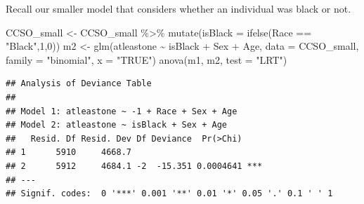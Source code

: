 \documentclass[
  ignorenonframetext,
]{beamer}
\newenvironment{Shaded}{\begin{snugshade}}{\end{snugshade}}
\newcommand{\AttributeTok}[1]{\textcolor[rgb]{0.77,0.63,0.00}{#1}}
\newcommand{\DecValTok}[1]{\textcolor[rgb]{0.00,0.00,0.81}{#1}}
\newcommand{\FunctionTok}[1]{\textcolor[rgb]{0.00,0.00,0.00}{#1}}
\newcommand{\NormalTok}[1]{#1}
\newcommand{\OtherTok}[1]{\textcolor[rgb]{0.56,0.35,0.01}{#1}}
\newcommand{\SpecialCharTok}[1]{\textcolor[rgb]{0.00,0.00,0.00}{#1}}
\newcommand{\StringTok}[1]{\textcolor[rgb]{0.31,0.60,0.02}{#1}}
\begin{document}
\begin{frame}[fragile]{}
\protect\hypertarget{section-4}{}
Recall our smaller model that considers whether an individual was black
or not.

\vspace{12pt}
\tiny

\begin{Shaded}
\begin{Highlighting}[]
\NormalTok{CCSO\_small }\OtherTok{\textless{}{-}}\NormalTok{ CCSO\_small }\SpecialCharTok{\%\textgreater{}\%} \FunctionTok{mutate}\NormalTok{(}\AttributeTok{isBlack =} \FunctionTok{ifelse}\NormalTok{(Race }\SpecialCharTok{==} \StringTok{"Black"}\NormalTok{,}\DecValTok{1}\NormalTok{,}\DecValTok{0}\NormalTok{))}
\NormalTok{m2 }\OtherTok{\textless{}{-}} \FunctionTok{glm}\NormalTok{(atleastone }\SpecialCharTok{\textasciitilde{}}\NormalTok{ isBlack }\SpecialCharTok{+}\NormalTok{ Sex }\SpecialCharTok{+}\NormalTok{ Age, }\AttributeTok{data =}\NormalTok{ CCSO\_small, }
          \AttributeTok{family =} \StringTok{"binomial"}\NormalTok{, }\AttributeTok{x =} \StringTok{"TRUE"}\NormalTok{)}
\FunctionTok{anova}\NormalTok{(m1, m2, }\AttributeTok{test =} \StringTok{"LRT"}\NormalTok{)}
\end{Highlighting}
\end{Shaded}

\begin{verbatim}
## Analysis of Deviance Table
## 
## Model 1: atleastone ~ -1 + Race + Sex + Age
## Model 2: atleastone ~ isBlack + Sex + Age
##   Resid. Df Resid. Dev Df Deviance  Pr(>Chi)    
## 1      5910     4668.7                          
## 2      5912     4684.1 -2  -15.351 0.0004641 ***
## ---
## Signif. codes:  0 '***' 0.001 '**' 0.01 '*' 0.05 '.' 0.1 ' ' 1
\end{verbatim}
\end{frame}
\end{document}
